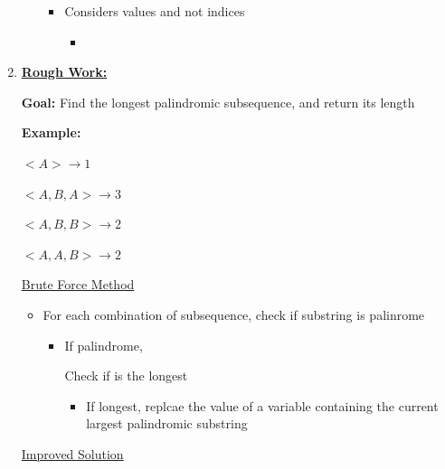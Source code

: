 \documentclass[12pt]{article}
\begin{document}
\begin{enumerate}[1.]
\begin{itemize}
\begin{itemize}
            \item Considers values and not indices

            \begin{itemize}
                \item
            \end{itemize}
        \end{itemize}
    \end{itemize}
    \item

    \bigskip

    \underline{\textbf{Rough Work:}}

    \bigskip

    \textbf{Goal:} Find the longest palindromic subsequence, and return its length

    \bigskip

    \textbf{Example:}

    \bigskip

    $<A> \to 1$

    $<A,B,A> \to 3$

    $<A,B,B> \to 2$

    $<A,A,B> \to 2$

    \bigskip

    \underline{Brute Force Method}

    \begin{itemize}
        \item For each combination of subsequence, check if substring
        is palinrome

        \begin{itemize}
            \item If palindrome,

            \bigskip

            Check if is the longest

            \bigskip

            \begin{itemize}
                \item If longest, replcae the value of a variable
                containing the current largest palindromic substring
            \end{itemize}

        \end{itemize}
    \end{itemize}

    \bigskip

    \underline{Improved Solution}


\end{enumerate}
\end{document}
